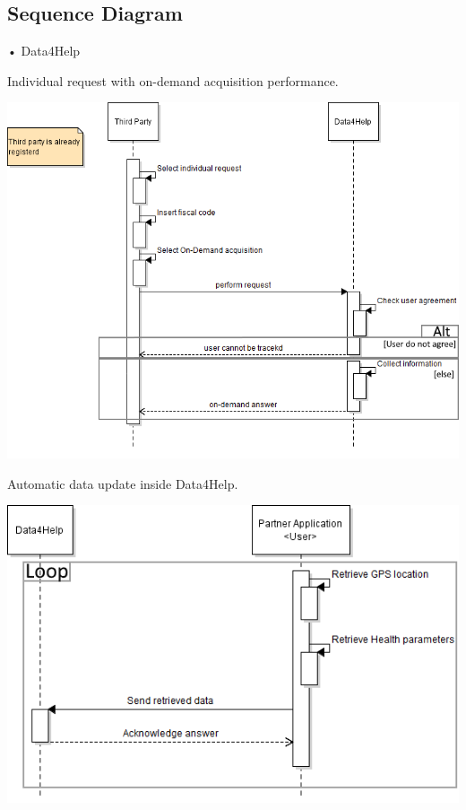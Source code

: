 \subsection{Sequence Diagram}
\begin{enumerate}
\begin{minipage}{\textwidth}
\FloatBarrier
\item[•]{\Large Data4Help}


Individual request with on-demand acquisition performance.
\begin{center}
\includegraphics[scale=0.8]{Images/Seq_Data4Help_onDem.png}
\end{center}
\FloatBarrier

\FloatBarrier
Automatic data update inside Data4Help.
\begin{center}
\includegraphics[scale=0.8]{Images/Seq_Data4Help_autoUp.png}
\end{center}
\FloatBarrier


\end{minipage}
\end{enumerate}
